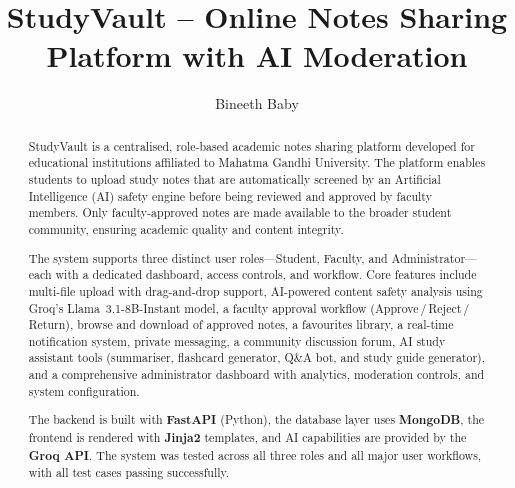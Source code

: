 \documentclass{sgcproject}
\title{StudyVault -- Online Notes Sharing Platform with AI Moderation}
\author{Bineeth Baby}
\begin{document}

\maketitle
\makecert

\newpage
{}
\setcounter{page}{1}
\renewcommand\abstractname{ABSTRACT}
\begin{abstract}
\vspace{5cm}

StudyVault is a centralised, role-based academic notes sharing platform developed for educational institutions affiliated to Mahatma Gandhi University. The platform enables students to upload study notes that are automatically screened by an Artificial Intelligence (AI) safety engine before being reviewed and approved by faculty members. Only faculty-approved notes are made available to the broader student community, ensuring academic quality and content integrity.

The system supports three distinct user roles---Student, Faculty, and Administrator---each with a dedicated dashboard, access controls, and workflow. Core features include multi-file upload with drag-and-drop support, AI-powered content safety analysis using Groq's Llama~3.1-8B-Instant model, a faculty approval workflow (Approve\,/\,Reject\,/\,Return), browse and download of approved notes, a favourites library, a real-time notification system, private messaging, a community discussion forum, AI study assistant tools (summariser, flashcard generator, Q\&A bot, and study guide generator), and a comprehensive administrator dashboard with analytics, moderation controls, and system configuration.

The backend is built with \textbf{FastAPI} (Python), the database layer uses \textbf{MongoDB}, the frontend is rendered with \textbf{Jinja2} templates, and AI capabilities are provided by the \textbf{Groq API}. The system was tested across all three roles and all major user workflows, with all test cases passing successfully.

\end{abstract}

\newpage
\end{document}

